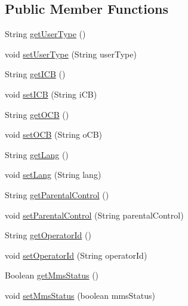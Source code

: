 \subsection*{Public Member Functions}
\begin{DoxyCompactItemize}
\item 
String \hyperlink{classcom_1_1bluevia_1_1directory_1_1data_1_1Profile_a55b5ad87816e0f8e15f322343bf3b1c1}{getUserType} ()
\item 
void \hyperlink{classcom_1_1bluevia_1_1directory_1_1data_1_1Profile_a1669c04a634627871ec1abbab3e20191}{setUserType} (String userType)
\item 
String \hyperlink{classcom_1_1bluevia_1_1directory_1_1data_1_1Profile_a28c0530d8f7b8f9d244b490adb303599}{getICB} ()
\item 
void \hyperlink{classcom_1_1bluevia_1_1directory_1_1data_1_1Profile_a20b6e69cc8fe64474e30b681604e528b}{setICB} (String iCB)
\item 
String \hyperlink{classcom_1_1bluevia_1_1directory_1_1data_1_1Profile_a9caff56e6a17452bfe6187c61f177035}{getOCB} ()
\item 
void \hyperlink{classcom_1_1bluevia_1_1directory_1_1data_1_1Profile_a393a1d991b214606f276cfd16d9c61b9}{setOCB} (String oCB)
\item 
String \hyperlink{classcom_1_1bluevia_1_1directory_1_1data_1_1Profile_a5d97bbe673f7efb069a26a9d97547dac}{getLang} ()
\item 
void \hyperlink{classcom_1_1bluevia_1_1directory_1_1data_1_1Profile_a7f4b65b049dce486538a00051b320c31}{setLang} (String lang)
\item 
String \hyperlink{classcom_1_1bluevia_1_1directory_1_1data_1_1Profile_a2219c0908e25850742efbe1f8fa08bd0}{getParentalControl} ()
\item 
void \hyperlink{classcom_1_1bluevia_1_1directory_1_1data_1_1Profile_a7a9f48e7070254a2346af781a61d9feb}{setParentalControl} (String parentalControl)
\item 
String \hyperlink{classcom_1_1bluevia_1_1directory_1_1data_1_1Profile_abd0cb37755e6ef70d5f2d18c8e1d08a6}{getOperatorId} ()
\item 
void \hyperlink{classcom_1_1bluevia_1_1directory_1_1data_1_1Profile_a72169953ffc03079b5cc03af4e107da6}{setOperatorId} (String operatorId)
\item 
Boolean \hyperlink{classcom_1_1bluevia_1_1directory_1_1data_1_1Profile_ae2919fe0bfcabc37713b8b8f7adc16a5}{getMmsStatus} ()
\item 
void \hyperlink{classcom_1_1bluevia_1_1directory_1_1data_1_1Profile_a2b8934128fc1715eb69948929c39f2e5}{setMmsStatus} (boolean mmsStatus)

\end{DoxyCompactItemize}

